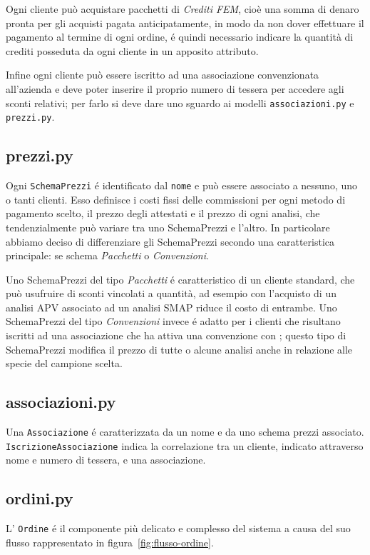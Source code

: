 Ogni cliente può acquistare pacchetti di \emph{Crediti FEM}, cioè una somma di denaro pronta per gli acquisti pagata anticipatamente, in modo da non dover effettuare il pagamento al termine di ogni ordine, é quindi necessario indicare la quantità di crediti posseduta da ogni cliente in un apposito attributo.

Infine ogni cliente può essere iscritto ad una associazione convenzionata all'azienda {\fem} e deve poter inserire il proprio numero di tessera per accedere agli sconti relativi; per farlo si deve dare uno sguardo ai modelli \texttt{associazioni.py} e \texttt{prezzi.py}.

\subsection*{prezzi.py}
\label{subs:prezzi}
Ogni \texttt{SchemaPrezzi} é identificato dal \texttt{nome} e può essere associato a nessuno, uno o tanti clienti. Esso definisce i costi fissi delle commissioni per ogni metodo di pagamento scelto, il prezzo degli attestati e il prezzo di ogni analisi, che tendenzialmente può variare tra uno SchemaPrezzi e l'altro.
In particolare abbiamo deciso di differenziare gli SchemaPrezzi secondo una caratteristica principale: se schema \emph{Pacchetti} o \emph{Convenzioni}.

Uno SchemaPrezzi del tipo \emph{Pacchetti} é caratteristico di un cliente standard, che può usufruire di sconti vincolati a quantità, ad esempio con l'acquisto di un analisi APV associato ad un analisi SMAP riduce il costo di entrambe. Uno SchemaPrezzi del tipo \emph{Convenzioni} invece é adatto per i clienti che risultano iscritti ad una associazione che ha attiva una convenzione con {\fem}; questo tipo di SchemaPrezzi modifica il prezzo di tutte o alcune analisi anche in relazione alle specie del campione scelta.

\subsection*{associazioni.py}
\label{subs:associazioni}
Una \texttt{Associazione} é caratterizzata da un nome e da uno schema prezzi associato. \texttt{IscrizioneAssociazione} indica la correlazione tra un cliente, indicato attraverso nome e numero di tessera, e una associazione.

\subsection*{ordini.py}
\label{subs:ordini}
L' \texttt{Ordine} é il componente più delicato e complesso del sistema a causa del suo flusso rappresentato in figura~\ref{fig:flusso-ordine}.

